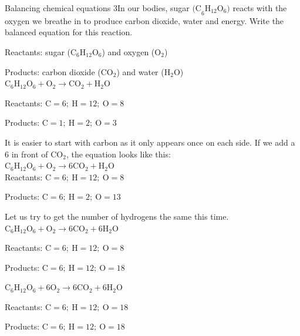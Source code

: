 \begin{wex}{Balancing chemical equations 3}{In our bodies, sugar ${\text{(C}_{6}\text{H}_{12}\text{O}_{6}\text{)}}$ reacts with the oxygen we breathe in to produce carbon dioxide, water and energy. Write the balanced equation for this reaction.}{
Reactants: sugar (${\text{C}_{6}\text{H}_{12}\text{O}_{6}}$) and oxygen (${\text{O}_{2}}$)

Products: carbon dioxide (${\text{CO}_{2}}$) and water (${\text{H}_{2}\text{O}}$)\\

    $\text{C}_{6}\text{H}_{12}\text{O}_{6} + \text{O}_{2} \rightarrow \text{CO}_{2} + \text{H}_{2}\text{O}$

   Reactants: $\text{C} = 6;~ \text{H} = 12; ~\text{O} = 8$

   Products: $\text{C} = 1;~ \text{H} = 2; ~\text{O} = 3$

   It is easier to start with carbon as it only appears once on each side. If we add a $6$ in front of ${\text{CO}_{2}}$, the equation looks like this:\\
    $\text{C}_{6}\text{H}_{12}\text{O}_{6} + \text{O}_{2} \rightarrow 6\text{CO}_{2} + \text{H}_{2}\text{O}$\\

   Reactants: $\text{C} = 6;~ \text{H} = 12; ~\text{O} = 8$

   Products: $\text{C} = 6;~ \text{H} = 2; ~\text{O} = 13$

Let us try to get the number of hydrogens the same this time.\\
    $\text{C}_{6}\text{H}_{12}\text{O}_{6} + \text{O}_{2} \rightarrow 6\text{CO}_{2} + 6\text{H}_{2}\text{O}$

   Reactants: $\text{C} = 6;~ \text{H} = 12; ~\text{O} = 8$

   Products: $\text{C} = 6;~ \text{H} = 12; ~\text{O} = 18$

  $\text{C}_{6}\text{H}_{12}\text{O}_{6} + 6\text{O}_{2} \rightarrow 6\text{CO}_{2} + 6\text{H}_{2}\text{O}$

   Reactants: $\text{C} = 6;~ \text{H} = 12; ~\text{O} = 18$

   Products: $\text{C} = 6;~ \text{H} = 12; ~\text{O} = 18$
}
\end{wex}
    \noindent
{}


